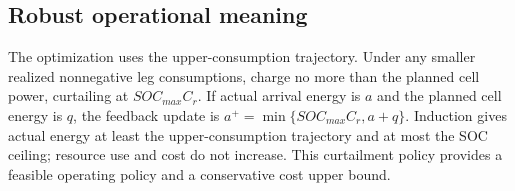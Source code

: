 \documentclass[11pt]{article}
\begin{document}
\subsection*{Robust operational meaning}
The optimization uses the upper-consumption trajectory. Under any smaller
realized nonnegative leg consumptions, charge no more than the planned
cell power, curtailing at $SOC_{max}C_r$. If actual arrival energy is $a$ and
the planned cell energy is $q$, the feedback update is
$a^+=\min\{SOC_{max}C_r,a+q\}$. Induction gives actual energy at least the
upper-consumption trajectory and at most the SOC ceiling; resource use and
cost do not increase. This curtailment policy provides a feasible operating policy and a conservative cost upper bound.
\end{document}
